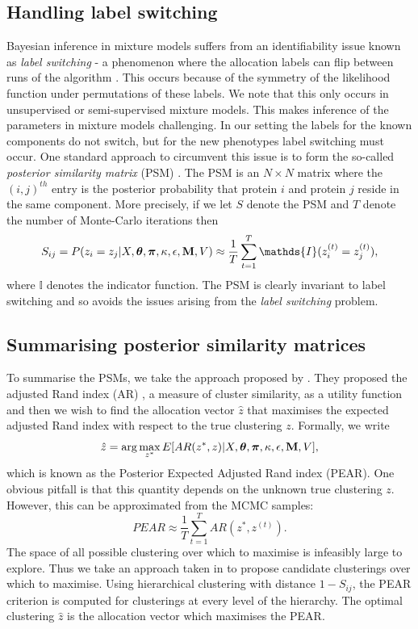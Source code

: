 \documentclass[12pt,english]{article}
\begin{document}
\subsection{Handling label switching}
Bayesian inference in mixture models suffers from an identifiability issue known as \textit{label switching} - a phenomenon where the allocation labels can flip between runs of the algorithm \citep{Richardson::1997, Stephens:2000}. This occurs because of the symmetry of the likelihood function under permutations of these labels. We note that this only occurs in unsupervised or semi-supervised mixture models. This makes inference of the parameters in mixture models challenging. In our setting the labels for the known components do not switch, but for the new phenotypes label switching must occur. One standard approach to circumvent this issue is to form the so-called \textit{posterior similarity matrix} (PSM) \citep{fritsch::2009}. The PSM is an $N\times N$ matrix where the $(i,j)^{th}$ entry is the posterior probability that protein $i$ and protein $j$ reside in the same component. More precisely, if we let $S$ denote the PSM and $T$ denote the number of Monte-Carlo iterations then 
\begin{equation}
S_{ij} = P(z_i = z_j| X, \boldsymbol{\theta}, \boldsymbol{\pi} , \kappa, \epsilon, {\bf M}, V) \approx \frac{1}{T} \sum_{t = 1}^{T} \mathds{I}(z^{(t)}_i = z^{(t)}_j),
\end{equation}
where $\mathds{I}$ denotes the indicator function. The PSM is clearly invariant to label switching and so avoids the issues arising from the \textit{label switching} problem. 
\subsection{Summarising posterior similarity matrices}
To summarise the PSMs, we take the approach proposed by \cite{fritsch::2009}. They proposed the adjusted Rand index (AR) \citep{rand::1971, Hubert::1985}, a measure of cluster similarity, as a utility function and then we wish to find the allocation vector $\hat{z}$ that maximises the expected adjusted Rand index with respect to the true clustering $z$. Formally, we write
\begin{equation}
\hat{z} = \arg \max_{z^*} E[AR(z^*, z)|X, \boldsymbol{\theta}, \boldsymbol{\pi} , \kappa, \epsilon, {\bf M}, V],
\end{equation}
which is known as the Posterior Expected Adjusted Rand index (PEAR). One obvious pitfall is that this quantity depends on the unknown true clustering $z$. However, this can be approximated from the MCMC samples:
\begin{equation}
PEAR \approx \frac{1}{T} \sum_{t = 1}^{T}AR(z^*, z^{(t)}).
\end{equation}
The space of all possible clustering over which to maximise is infeasibly large to explore. Thus we take an approach taken in \cite{fritsch::2009} to propose candidate clusterings over which to maximise. Using hierarchical clustering with distance $1 - S_{ij}$, the PEAR criterion is computed for clusterings at every level of the hierarchy. The optimal clustering $\hat{z}$ is the allocation vector which maximises the PEAR.
\end{document}
